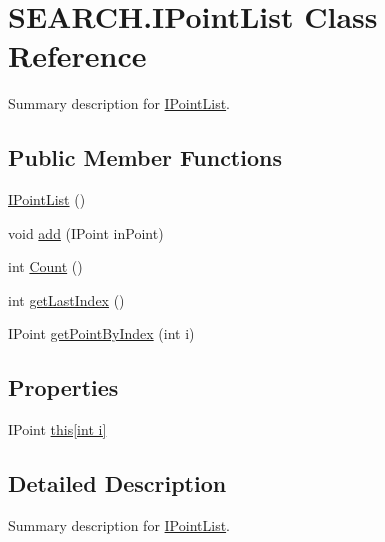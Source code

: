 \hypertarget{class_s_e_a_r_c_h_1_1_i_point_list}{\section{S\-E\-A\-R\-C\-H.\-I\-Point\-List Class Reference}
\label{class_s_e_a_r_c_h_1_1_i_point_list}
}


Summary description for \hyperlink{class_s_e_a_r_c_h_1_1_i_point_list}{I\-Point\-List}.  


\subsection*{Public Member Functions}
\begin{DoxyCompactItemize}
\item 
\hyperlink{class_s_e_a_r_c_h_1_1_i_point_list_a3af15b08aac6355d650f3258cde0d88b}{I\-Point\-List} ()
\item 
void \hyperlink{class_s_e_a_r_c_h_1_1_i_point_list_af71c94382995f0c502e4534375619535}{add} (I\-Point in\-Point)
\item 
int \hyperlink{class_s_e_a_r_c_h_1_1_i_point_list_a5e843c9280b68b78b887c7b824a5279b}{Count} ()
\item 
int \hyperlink{class_s_e_a_r_c_h_1_1_i_point_list_a43d755ce04da0e154b8a58344b2c5860}{get\-Last\-Index} ()
\item 
I\-Point \hyperlink{class_s_e_a_r_c_h_1_1_i_point_list_ab04c40a619d61c9ad1b90c7e0e9622ac}{get\-Point\-By\-Index} (int i)
\end{DoxyCompactItemize}
\subsection*{Properties}
\begin{DoxyCompactItemize}
\item 
I\-Point \hyperlink{class_s_e_a_r_c_h_1_1_i_point_list_a558dbec58b22e46745973e7136ac1ea3}{this\mbox{[}int i\mbox{]}}
\end{DoxyCompactItemize}


\subsection{Detailed Description}
Summary description for \hyperlink{class_s_e_a_r_c_h_1_1_i_point_list}{I\-Point\-List}. 




